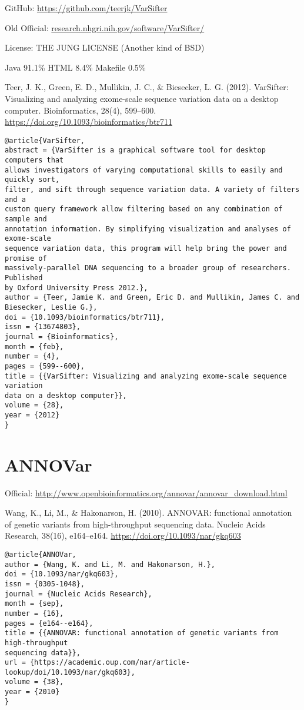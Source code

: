 \documentclass[]{article}
\begin{document}
GitHub: \url{https://github.com/teerjk/VarSifter}

Old Official: \url{research.nhgri.nih.gov/software/VarSifter/}

License: THE JUNG LICENSE (Another kind of BSD)

Java 91.1\% HTML 8.4\% Makefile 0.5\%



Teer, J. K., Green, E. D., Mullikin, J. C., \& Biesecker, L. G. (2012). VarSifter: Visualizing and analyzing exome-scale sequence variation data on a desktop computer. Bioinformatics, 28(4), 599–600. \url{https://doi.org/10.1093/bioinformatics/btr711}

\begin{verbatim}
@article{VarSifter,
abstract = {VarSifter is a graphical software tool for desktop computers that
allows investigators of varying computational skills to easily and quickly sort,
filter, and sift through sequence variation data. A variety of filters and a
custom query framework allow filtering based on any combination of sample and
annotation information. By simplifying visualization and analyses of exome-scale
sequence variation data, this program will help bring the power and promise of
massively-parallel DNA sequencing to a broader group of researchers. Published
by Oxford University Press 2012.},
author = {Teer, Jamie K. and Green, Eric D. and Mullikin, James C. and
Biesecker, Leslie G.},
doi = {10.1093/bioinformatics/btr711},
issn = {13674803},
journal = {Bioinformatics},
month = {feb},
number = {4},
pages = {599--600},
title = {{VarSifter: Visualizing and analyzing exome-scale sequence variation
data on a desktop computer}},
volume = {28},
year = {2012}
}
\end{verbatim}

\section{ANNOVar}

Official: \url{http://www.openbioinformatics.org/annovar/annovar_download.html}

Wang, K., Li, M., \& Hakonarson, H. (2010). ANNOVAR: functional annotation of genetic variants from high-throughput sequencing data. Nucleic Acids Research, 38(16), e164–e164. \url{https://doi.org/10.1093/nar/gkq603}

\begin{verbatim}
@article{ANNOVar,
author = {Wang, K. and Li, M. and Hakonarson, H.},
doi = {10.1093/nar/gkq603},
issn = {0305-1048},
journal = {Nucleic Acids Research},
month = {sep},
number = {16},
pages = {e164--e164},
title = {{ANNOVAR: functional annotation of genetic variants from high-throughput
sequencing data}},
url = {https://academic.oup.com/nar/article-lookup/doi/10.1093/nar/gkq603},
volume = {38},
year = {2010}
}

\end{verbatim}
\end{document}
